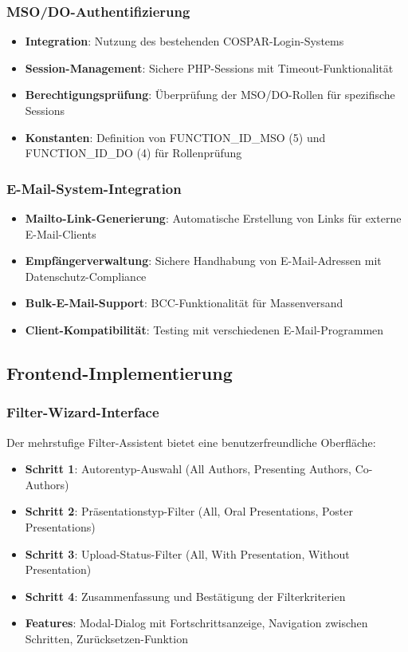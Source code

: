 \documentclass[11pt,a4paper]{article}
\begin{document}
\subsubsection{MSO/DO-Authentifizierung}
\begin{itemize}
    \item \textbf{Integration}: Nutzung des bestehenden COSPAR-Login-Systems
    \item \textbf{Session-Management}: Sichere PHP-Sessions mit Timeout-Funktionalität
    \item \textbf{Berechtigungsprüfung}: Überprüfung der MSO/DO-Rollen für spezifische Sessions
    \item \textbf{Konstanten}: Definition von FUNCTION\_ID\_MSO (5) und FUNCTION\_ID\_DO (4) für Rollenprüfung
\end{itemize}

\subsubsection{E-Mail-System-Integration}
\begin{itemize}
    \item \textbf{Mailto-Link-Generierung}: Automatische Erstellung von Links für externe E-Mail-Clients
    \item \textbf{Empfängerverwaltung}: Sichere Handhabung von E-Mail-Adressen mit Datenschutz-Compliance
    \item \textbf{Bulk-E-Mail-Support}: BCC-Funktionalität für Massenversand
    \item \textbf{Client-Kompatibilität}: Testing mit verschiedenen E-Mail-Programmen
\end{itemize}

\subsection{Frontend-Implementierung}

\subsubsection{Filter-Wizard-Interface}
Der mehrstufige Filter-Assistent bietet eine benutzerfreundliche Oberfläche:
\begin{itemize}
    \item \textbf{Schritt 1}: Autorentyp-Auswahl (All Authors, Presenting Authors, Co-Authors)
    \item \textbf{Schritt 2}: Präsentationstyp-Filter (All, Oral Presentations, Poster Presentations)
    \item \textbf{Schritt 3}: Upload-Status-Filter (All, With Presentation, Without Presentation)
    \item \textbf{Schritt 4}: Zusammenfassung und Bestätigung der Filterkriterien
    \item \textbf{Features}: Modal-Dialog mit Fortschrittsanzeige, Navigation zwischen Schritten, Zurücksetzen-Funktion
\end{itemize}
\end{document}
